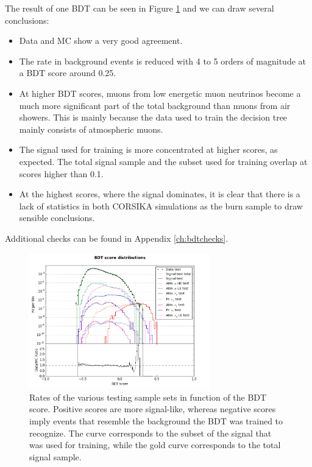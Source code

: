 \noindent The result of one BDT can be seen in Figure \ref{fig:singlebdtrate} and we can draw several conclusions:
\vspace{2mm}
\begin{itemize}
\item Data and MC show a very good agreement.
\item The rate in background events is reduced with 4 to 5 orders of magnitude at a BDT score around 0.25.
\item At higher BDT scores, muons from low energetic muon neutrinos become a much more significant part of the total background than muons from air showers. This is mainly because the data used to train the decision tree mainly consists of atmospheric muons.
\item The signal used for training is more concentrated at higher scores, as expected. The total signal sample and the subset used for training overlap at scores higher than 0.1.
\item At the highest scores, where the signal dominates, it is clear that there is a lack of statistics in both CORSIKA simulations as the burn sample to draw sensible conclusions.
\end{itemize}
\vspace{2mm}
Additional checks can be found in Appendix \ref{ch:bdtchecks}.\\

\begin{figure}
\centering
\includegraphics[width = 0.7\textwidth]{chapter8/img/dist_vs_bdt_result2_signal_m_100_charge1ovr2_better.png}
\caption{Rates of the various testing sample sets in function of the BDT score. Positive scores are more signal-like, whereas negative scores imply events that resemble the background the BDT was trained to recognize. The curve corresponds to the subset of the signal that was used for training, while the gold curve corresponds to the total signal sample.}
\label{fig:singlebdtrate}
\end{figure}

